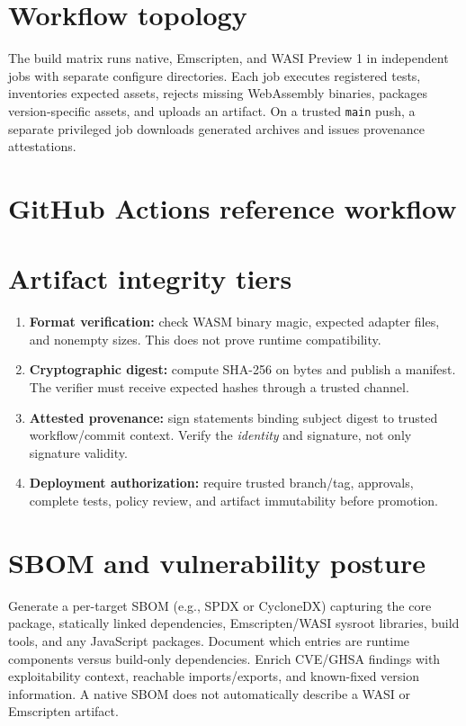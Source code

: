 \documentclass[11pt,letterpaper]{article}
\begin{document}
\frontmatterdoc
\section{Workflow topology}
The build matrix runs native, Emscripten, and WASI Preview 1 in independent jobs with separate configure directories. Each job executes registered tests, inventories expected assets, rejects missing WebAssembly binaries, packages version-specific assets, and uploads an artifact. On a trusted \texttt{main} push, a separate privileged job downloads generated archives and issues provenance attestations.

\section{GitHub Actions reference workflow}


\section{Artifact integrity tiers}
\begin{enumerate}
\item \textbf{Format verification:} check WASM binary magic, expected adapter files, and nonempty sizes. This does not prove runtime compatibility.
\item \textbf{Cryptographic digest:} compute SHA-256 on bytes and publish a manifest. The verifier must receive expected hashes through a trusted channel.
\item \textbf{Attested provenance:} sign statements binding subject digest to trusted workflow/commit context. Verify the \emph{identity} and signature, not only signature validity.
\item \textbf{Deployment authorization:} require trusted branch/tag, approvals, complete tests, policy review, and artifact immutability before promotion.
\end{enumerate}


\section{SBOM and vulnerability posture}
Generate a per-target SBOM (e.g., SPDX or CycloneDX) capturing the core package, statically linked dependencies, Emscripten/WASI sysroot libraries, build tools, and any JavaScript packages. Document which entries are runtime components versus build-only dependencies. Enrich CVE/GHSA findings with exploitability context, reachable imports/exports, and known-fixed version information. A native SBOM does not automatically describe a WASI or Emscripten artifact.
\end{document}
